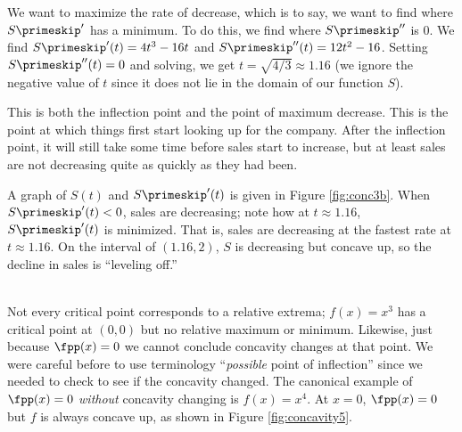 {We want to maximize the rate of decrease, which is to say, we want to find where $S\primeskip'$ has a minimum.  To do this, we find where $S\primeskip''$ is 0.  We find $S\primeskip'(t)=4t^3-16t$ and $S\primeskip''(t)=12t^2-16$.  Setting $S\primeskip''(t)=0$ and solving, we get $t=\sqrt{4/3}\approx 1.16$ (we ignore the negative value of $t$ since it does not lie in the domain of our function $S$).

This is both the inflection point and the point of maximum decrease.  This is the point at which things first start looking up for the company.  After the inflection point, it will still take some time before sales start to increase, but at least sales are not decreasing quite as quickly as they had been.

A graph of $S(t)$ and $S\primeskip'(t)$ is given in Figure \ref{fig:conc3b}. When $S\primeskip'(t)<0$, sales are decreasing; note how at $t\approx 1.16$, $S\primeskip'(t)$ is minimized. That is, sales are decreasing at the fastest rate at $t\approx 1.16$.  On the interval of $(1.16,2)$, $S$ is decreasing but concave up, so the decline in sales is ``leveling off.''
}\\



Not every critical point corresponds to a relative extrema; $f(x)=x^3$ has a critical point at $(0,0)$ but no relative maximum or minimum. Likewise, just because $\fpp(x)=0$ we cannot conclude concavity changes at that point. We were careful before to use terminology ``\textit{possible} point of inflection'' since we needed to check to see if the concavity changed. The canonical example of $\fpp(x)=0$ \textit{without} concavity changing is $f(x)=x^4$. At $x=0$, $\fpp(x)=0$ but $f$ is always concave up, as shown in Figure \ref{fig:concavity5}.\\


